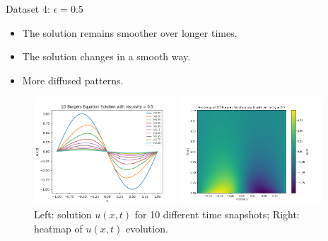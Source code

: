 \begin{secframe}

\begin{block}{Dataset 4: $\epsilon = 0.5$}
\begin{itemize}
  \item \small The solution remains smoother over longer times.
  \item \small The solution changes in a smooth way.
  \item \small More diffused patterns. 
\end{itemize}
\end{block}

\begin{figure}[h!]
    \centering
    \begin{minipage}[t]{0.48\linewidth}
        \centering
        \includegraphics[height=4.0cm]{images/graphical_visualization_1DBurgers_visc_05.png}
    \end{minipage}\hfill
    \begin{minipage}[t]{0.48\linewidth}
        \centering
        \includegraphics[height=4.0cm]{images/Heatmap_1DBurgers_visc_05.png}
    \end{minipage}
    \caption{\scriptsize Left: solution $u(x,t)$ for 10 different time snapshots; Right: heatmap of $u(x,t)$ evolution.}
\end{figure}
\end{secframe}